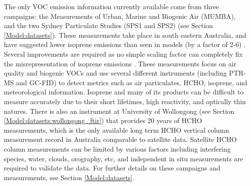    
    The only VOC emission information currently available come from three campaigns: the Measurements of Urban, Marine and Biogenic Air (MUMBA), and the two Sydney Particulate Studies (SPS1 and SPS2) (see Section \ref{Model:datasets}).
    These measurements take place in south eastern Australia, and have suggested lower isoprene emissions than seen in models (by a factor of 2-6) \parencite{Emmerson2016}.
    Several improvements are required as no simple scaling factor can completely fix the misrepresentation of isoprene emissions \parencite{Emmerson2016}.
    These measurements focus on air quality and biogenic VOCs and use several different instruments (including PTR-MS and GC-FID) to detect metrics such as air particulates, HCHO, isoprene, and meteorological information.
    Isoprene and many of its products can be difficult to measure accurately due to their short lifetimes, high reactivity, and optically thin natures.
    There is also an instrument at University of Wollongong (see Section \ref{Model:datasets:wollongong_ftir}) that provides 20 years of HCHO measurements, which is the only available long term HCHO vertical column measurement record in Australia comparable to satellite data. 
    Satellite HCHO column measurements can be limited by various factors including interfering species, water, clouds, orography, etc, and independent in situ measurements are required to validate the data. %
    For further details on these campaigns and measurements, see Section \ref{Model:datasets}.
    
